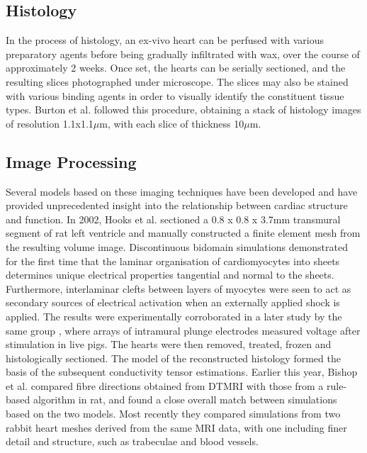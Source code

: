   \subsection{Histology} %
  \label{sub:histology}
  In the process of histology, an ex-vivo heart can be perfused with various preparatory agents before being gradually infiltrated with wax, over the course of approximately 2 weeks. Once set, the hearts can be serially sectioned, and the resulting slices photographed under microscope. The slices may also be stained with various binding agents in order to visually identify the constituent tissue types. Burton et al. \cite{Burton:2006p100} followed this procedure, obtaining a stack of histology images of resolution 1.1x1.1$\mu$m, with each slice of thickness 10$\mu$m.
  
  
  \subsection{Image Processing} %
  \label{sub:image_processing}
  
    Several models based on these imaging techniques have been developed and have provided unprecedented insight into the relationship between cardiac structure and function. In 2002, Hooks et al. \cite{Hooks:2002p442} sectioned a 0.8 x 0.8 x 3.7mm transmural segment of rat left ventricle and manually constructed a finite element mesh from the resulting volume image.  Discontinuous bidomain simulations demonstrated for the first time that the laminar organisation of cardiomyocytes into sheets determines unique electrical properties tangential and normal to the sheets. Furthermore, interlaminar clefts between layers of myocytes were seen to act as secondary sources of electrical activation when an externally applied shock is applied. The results were experimentally corroborated in a later study by the same group \cite{Hooks:2007p441}, where arrays of intramural plunge electrodes measured voltage after stimulation in live pigs. The hearts were then removed, treated, frozen and histologically sectioned. The model of the reconstructed histology formed the basis of the subsequent conductivity tensor estimations. Earlier this year, Bishop et al. \cite{Bishop:2009p940} compared fibre directions obtained from DTMRI with those from a rule-based algorithm in rat, and found a close overall match between simulations based on the two models. Most recently \cite{Bishop:2009p444} they compared simulations from two rabbit heart meshes derived from the same MRI data, with one including finer detail and structure, such as trabeculae and blood vessels.
  
